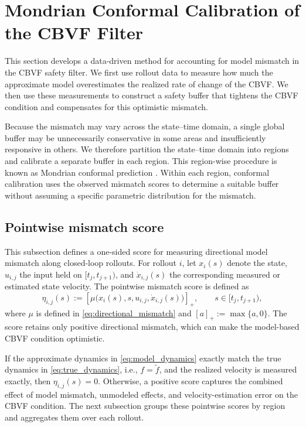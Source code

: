 \documentclass[letterpaper,10pt,conference]{ieeeconf}
\newcommand{\fapp}{\widetilde{f}}
\newcommand{\xv}{x}
\newcommand{\pos}[1]{\left[#1\right]_+}
\begin{document}

\section{Mondrian Conformal Calibration of the CBVF Filter}
\label{sec:conformal_calibration}



This section develops a data-driven method for accounting for model mismatch in
the CBVF safety filter. We first use rollout data to measure how much the
approximate model overestimates the realized rate of change of the CBVF. We
then use these measurements to construct a safety buffer that tightens the
CBVF condition and compensates for this optimistic mismatch.

Because the mismatch may vary across the state--time domain, a single global
buffer may be unnecessarily conservative in some areas and insufficiently
responsive in others. We therefore partition the state--time domain into
regions and calibrate a separate buffer in each region. This region-wise
procedure is known as Mondrian conformal prediction
\cite{vovk2013conditional,bostrom2021mondrian}. Within each region, conformal
calibration uses the observed mismatch scores to determine a suitable buffer
without assuming a specific parametric distribution for the mismatch.





\subsection{Pointwise mismatch score}
\label{subsec:pointwise_mismatch_score}

This subsection defines a one-sided score for measuring directional model
mismatch along closed-loop rollouts. For rollout $i$, let $\xv_i(s)$ denote
the state, $u_{i,j}$ the input held on $[t_j,t_{j+1})$, and
$\dot\xv_{i,j}(s)$ the corresponding measured or estimated state velocity.
The pointwise mismatch score is defined as
\begin{equation}
    \eta_{i,j}(s)
    :=
    \pos{\mu\bigl(\xv_i(s),s,u_{i,j},\dot\xv_{i,j}(s)\bigr)},
    \qquad s\in[t_j,t_{j+1}),
    \label{eq:eta_def}
\end{equation}
where $\mu$ is defined in \eqref{eq:directional_mismatch} and
$\pos{a}:=\max\{a,0\}$. The score retains only positive directional mismatch,
which can make the model-based CBVF condition optimistic.

If the approximate dynamics in \eqref{eq:model_dynamics} exactly match the
true dynamics in \eqref{eq:true_dynamics}, i.e., $f=\fapp$, and the realized
velocity is measured exactly, then $\eta_{i,j}(s)=0$. Otherwise, a positive
score captures the combined effect of model mismatch, unmodeled effects, and
velocity-estimation error on the CBVF condition. The next subsection groups
these pointwise scores by region and aggregates them over each rollout.
\end{document}
